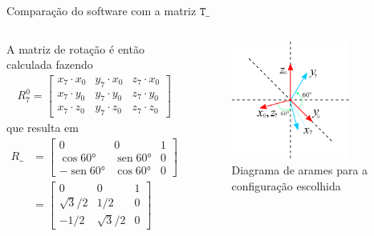 \documentclass[aspectratio=169]{beamer}
\DeclareMathOperator{\sen}{sen}
\begin{document}
\begin{frame}{Comparação do software com a matriz $\mathtt{T\_}$}
\begin{columns}
A matriz de rotação é então calculada fazendo
\begin{align*}
    R_7^0 =
    \left[ 
    \begin{array}{ccc}
        x_7 \cdot x_0 & y_7 \cdot x_0 & z_7 \cdot x_0 \\
        x_7 \cdot y_0 & y_7 \cdot y_0 & z_7 \cdot y_0 \\
        x_7 \cdot z_0 & y_7 \cdot z_0 & z_7 \cdot z_0
    \end{array}
    \right]
\end{align*}
que resulta em
\begin{align}
    R\_ &=
    \left[ 
    \begin{array}{rrr}
        0 & 0 & 1 \\
         \cos\ang{60} & \sen\ang{60} & 0 \\
        -\sen\ang{60} & \cos\ang{60} & 0
    \end{array}
    \right] \nonumber\\
    &= 
    \left[ 
    \begin{array}{rrr}
        0 & 0 & 1 \\
        \sqrt{3}/2 & 1/2 & 0 \\
        -1/2 & \sqrt{3}/2 & 0
    \end{array}
    \right]
    \label{eq:R_analise_dim}
\end{align}

\begin{figure}
    \centering
    \includegraphics[width=0.8\textwidth]{Fig/zoom_pos-escolhida.eps}
    \caption{Diagrama de arames para a configuração escolhida}
    \label{fig:zoom_arames_escolhido}
\end{figure}
\end{columns}
\end{frame}
\end{document}
